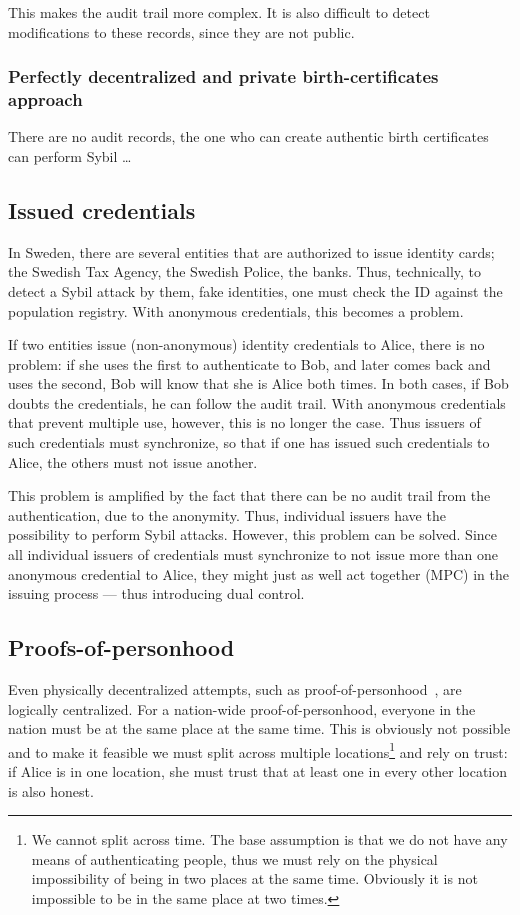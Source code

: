 This makes the audit trail more complex.
It is also difficult to detect modifications to these records, since they are 
not public.

\subsubsection{Perfectly decentralized and private birth-certificates approach}

There are no audit records, the one who can create authentic birth certificates 
can perform Sybil \dots


\subsection{Issued credentials}

In Sweden, there are several entities that are authorized to issue identity 
cards; \eg the Swedish Tax Agency, the Swedish Police, the banks.
Thus, technically, to detect a Sybil attack by them, \ie fake identities, one 
must check the ID against the population registry.
With anonymous credentials, this becomes a problem.

If two entities issue (non-anonymous) identity credentials to Alice, there is 
no problem: if she uses the first to authenticate to Bob, and later comes back 
and uses the second, Bob will know that she is Alice both times.
In both cases, if Bob doubts the credentials, he can follow the audit trail.
With anonymous credentials that prevent multiple use, however, this is no 
longer the case.
Thus issuers of such credentials must synchronize, so that if one has issued 
such credentials to Alice, the others must not issue another.

This problem is amplified by the fact that there can be no audit trail from the 
authentication, due to the anonymity.
Thus, individual issuers have the possibility to perform Sybil attacks.
However, this problem can be solved.
Since all individual issuers of credentials must synchronize to not issue more 
than one anonymous credential to Alice, they might just as well act together 
(\ac{MPC}) in the issuing process --- thus introducing dual control.

\subsection{Proofs-of-personhood}

Even physically decentralized attempts, such as 
proof-of-personhood~\cite{proof-of-personhood}, are logically centralized.
For a nation-wide proof-of-personhood, everyone in the nation must be at the 
same place at the same time.
This is obviously not possible and to make it feasible we must split across 
multiple locations\footnote{%
  We cannot split across time.
  The base assumption is that we do not have any means of authenticating 
  people, thus we must rely on the physical impossibility of being in two 
  places at the same time.
  Obviously it is not impossible to be in the same place at two times.
} and rely on trust: if Alice is in one location, she must trust that at least 
one in every other location is also honest.

